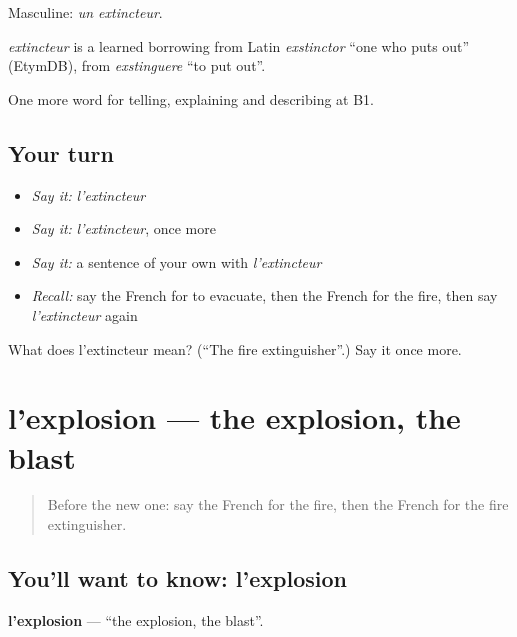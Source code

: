 Masculine: \emph{un extincteur}.

\begin{cousinweb}
\emph{extincteur} is a learned borrowing from Latin \emph{exstinctor} \textquotedblleft{}one who puts out\textquotedblright{} (EtymDB), from \emph{exstinguere} \textquotedblleft{}to put out\textquotedblright{}.
\end{cousinweb}

\begin{grammarlens}[title={What you've built}]
One more word for telling, explaining and describing at B1.
\end{grammarlens}

\subsection*{Your turn}
\begin{itemize}
\raggedright
  \item \emph{Say it:} \emph{l'extincteur}
  \item \emph{Say it:} \emph{l'extincteur}, once more
  \item \emph{Say it:} a sentence of your own with \emph{l'extincteur}
  \item \emph{Recall:} say the French for to evacuate, then the French for the fire, then say \emph{l'extincteur} again
\end{itemize}

\begin{tcolorbox}[breakable,colback=teal!4,colframe=teal!35!black,title={Before you move on}]
What does l'extincteur mean? (\textquotedblleft{}The fire extinguisher\textquotedblright{}.) Say it once more.
\end{tcolorbox}
\section[l'explosion]{l'explosion — the explosion, the blast}

\label{lesson:FR-C302-explosion}



\begin{quote}
Before the new one: say the French for the fire, then the French for the fire extinguisher.
\end{quote}

\subsection*{You'll want to know: l'explosion}
\textbf{l'explosion} — \textquotedblleft{}the explosion, the blast\textquotedblright{}.

